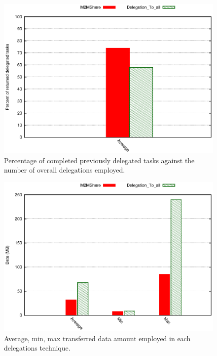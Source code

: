 \begin{figure}[htbp]
\centering
\includegraphics{grafici/percDeleghe.eps}
\caption{Percentage of completed previously delegated tasks against the number of overall delegations employed.}
\label{graficoPercDelegheRitornate}
\end{figure}

\begin{figure}[htbp]
\centering
\includegraphics{grafici/data.eps}
\caption{Average, min, max transferred data amount employed in each delegations technique.}
\label{graficoDataDiverseDel}
\end{figure}


